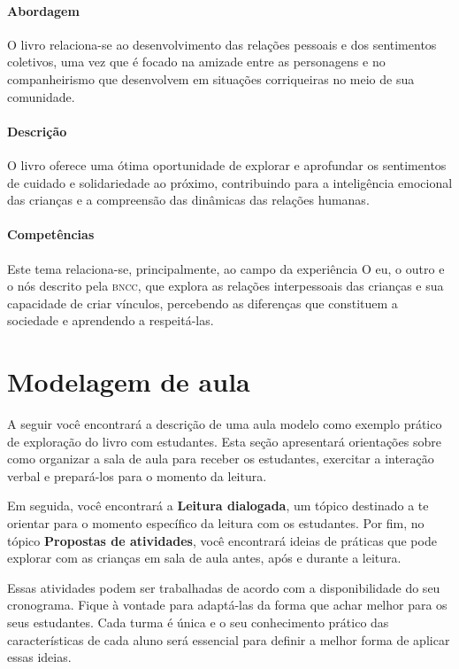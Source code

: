 \documentclass[11pt]{extarticle}
\begin{document}
\paragraph{Abordagem} O livro relaciona-se ao desenvolvimento das relações pessoais e dos sentimentos coletivos, uma vez que é focado na amizade entre as personagens e no companheirismo que desenvolvem em situações corriqueiras no meio de sua comunidade.

\paragraph{Descrição} O livro oferece uma ótima oportunidade de explorar 
e aprofundar os sentimentos de cuidado e solidariedade ao próximo, contribuindo para a inteligência emocional das crianças e a compreensão das dinâmicas das relações humanas.

\paragraph{Competências} Este tema relaciona-se, principalmente, ao 
campo da experiência O eu, o outro e o nós 
descrito pela \textsc{bncc}, que explora as relações interpessoais das crianças e sua capacidade de criar vínculos, percebendo as diferenças que constituem a sociedade e aprendendo a respeitá-las.


\section{Modelagem de aula}
A seguir você encontrará a descrição de uma aula modelo como exemplo 
prático de exploração do livro com estudantes. Esta seção apresentará 
orientações sobre como organizar a sala de aula para receber os 
estudantes, exercitar a interação verbal e prepará-los para o 
momento da leitura.

Em seguida, você encontrará a \textbf{Leitura dialogada}, um 
tópico destinado a te orientar para o momento específico da 
leitura com os estudantes. Por fim, no tópico 
\textbf{Propostas de atividades}, você encontrará ideias 
de práticas que pode explorar com as crianças em sala de 
aula antes, após e durante a leitura. 

Essas atividades podem ser trabalhadas de acordo com a 
disponibilidade do seu cronograma. Fique à vontade para adaptá-las 
da forma que achar melhor para os seus estudantes. Cada turma é única 
e o seu conhecimento prático das características de cada aluno será 
essencial para definir a melhor forma de aplicar essas ideias. 
\end{document}
